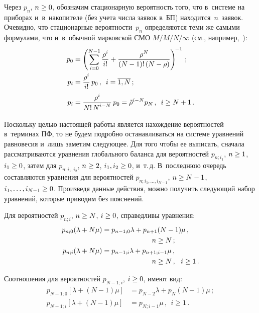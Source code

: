 \begin{multicols}{2}
Через $p_n$, ${n\hm\ge 0}$, обозначим
стационарную веро\-ят\-ность того, что в~системе на
приборах и~в~нако\-пи\-те\-ле (без учета числа заявок в~БП) находится~$n$~заявок.
Очевидно, что стационарные вероятности~$p_n$ определяются теми же самыми формулами, что 
и~в~обычной марковской СМО $M/M/N/\infty$
(см., например,~\cite{rior}):
\begin{align}
p_{0} &= \left( \sum\limits_{i=0}^{N-1} \displaystyle\frac{\displaystyle \rho^i\mathstrut}{\displaystyle i!\mathstrut}
+ \displaystyle\frac{\displaystyle \rho^N \mathstrut}{\displaystyle (N-1)!\, (N-\rho)\mathstrut}
\right)^{\!-1}\, ;\notag
\\
p_{i} &= \displaystyle\frac{\displaystyle \rho^i\mathstrut}{\displaystyle i!\mathstrut}\, p_{0}\,, \enskip i=\overline{1,N}\,;\notag
\\
\label{3-3}
p_{i} &= \displaystyle\frac{\displaystyle \rho^i\mathstrut}{\displaystyle N!\, N^{i-N}\mathstrut}\, p_{0}
= \tilde{\rho}^{i-N} p_{N}\,, \enskip i\ge N+1\,.
\end{align}

Поскольку целью настоящей работы является нахождение вероятностей
в~терминах ПФ, то не будем подробно останавливаться
на системе уравнений равновесия и~лишь заметим следующее.
Для того чтобы ее выписать, сначала рассматриваются
 уравнения глобального баланса для вероятностей
$p_{n;i_1}$, $n\hm\ge 1$, $i_1 \hm\ge 0$,
затем для $p_{n;i_1,i_2}$, $n\hm\ge2$, $i_1,i_2 \hm\ge 0$,
и~т.\,д. В~последнюю очередь составляются уравнения для вероятностей
$p_{n;i_1,\ldots,i_{N-1}}$, $n\hm\ge N-1$, $i_1,\ldots,i_{N-1} \hm\ge 0$.
Произведя данные действия, можно получить следующий набор
уравнений, которые приводим без пояснений.

Для вероятностей $p_{n;i}$, $n\hm\ge N$, $i\hm \ge 0$, справедливы уравнения:
\begin{align}
\label{eq-1-1}
 p_{n;0} (\lambda+N\mu) &=
p_{n-1;0} \lambda + p_{n+1} (N-1) \mu\,,\notag\\
&\hspace*{25mm}n\ge N\,;
\\
\label{eq-1-2} 
p_{n;i} (\lambda+N\mu) &=
p_{n-1;i} \lambda + p_{n+1;i-1} \mu\,,\ \notag\\ 
&\hspace*{25mm}n\ge N\,,\ \ i \ge 1\,.
\end{align}

Соотношения для вероятностей $p_{N-1;i}$, $i \hm\ge 0$,
имеют вид:
\begin{align}
\label{eq-1-3}
p_{N-1;0} [\lambda+(N-1)\mu]
&= p_{N-2} \lambda + p_{N} (N-1)\mu \,;
\\
\label{eq-1-4}
p_{N-1;i} [\lambda+(N-1)\mu] &= p_{N;i-1} \mu \,,\ \ i \ge 1\,.
\end{align}


\end{multicols}

